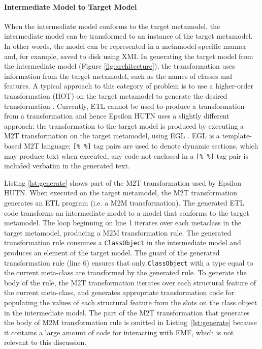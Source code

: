 \paragraph{Intermediate Model to Target Model}
When the intermediate model conforms to the target metamodel, the intermediate model can be transformed to an instance of the target metamodel. In other words, the model can be represented in a metamodel-specific manner and, for example, saved to disk using XMI. In generating the target model from the intermediate model (Figure \ref{fig:architecture}), the transformation uses information from the target metamodel, such as the names of classes and features. A typical approach to this category of problem is to use a higher-order transformation (HOT) on the target metamodel to generate the desired transformation \cite{tisi09hot}. Currently, ETL cannot be used to produce a transformation from a transformation and hence Epsilon HUTN uses a slightly different approach: the transformation to the target model is produced by executing a M2T transformation on the target metamodel, using EGL \cite{rose08egl}. EGL is a template-based M2T language; \verb|[% %]| tag pairs are used to denote dynamic sections, which may produce text when executed; any code not enclosed in a \verb|[% %]| tag pair is included verbatim in the generated text.

Listing \ref{lst:generate} shows part of the M2T transformation used by Epsilon HUTN. When executed on the target metamodel, the M2T transformation generates an ETL program (i.e. a M2M transformation). The generated ETL code transforms an intermediate model to a model that conforms to the target metamodel. The loop beginning on line 1 iterates over each metaclass in the target metamodel, producing a M2M transformation rule. The generated transformation rule consumes a \texttt{Cl\-a\-ssOb\-je\-ct} in the intermediate model and produces an element of the target model. The guard of the generated transformation rule (line 6) ensures that only \texttt{Cl\-a\-ssOb\-je\-ct} with a type equal to the current meta-class are transformed by the generated rule. To generate the body of the rule, the M2T transformation iterates over each structural feature of the current meta-class, and generates appropriate transformation code for populating the values of each structural feature from the slots on the class object in the intermediate model. The part of the M2T transformation that generates the body of M2M transformation rule is omitted in Listing~\ref{lst:generate} because it contains a large amount of code for interacting with EMF, which is not relevant to this discussion.

